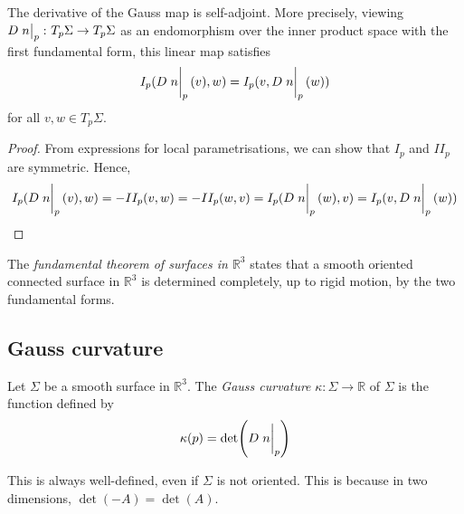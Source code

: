 \begin{lemma}
	The derivative of the Gauss map is self-adjoint.
	More precisely, viewing \( D \eval{n}_p \colon T_p \Sigma \to T_p \Sigma \) as an endomorphism over the inner product space with the first fundamental form, this linear map satisfies
	\[ I_p(D \eval{n}_p(v), w) = I_p(v, D \eval{n}_p(w)) \]
	for all \( v, w \in T_p \Sigma \).
\end{lemma}
\begin{proof}
	From expressions for local parametrisations, we can show that \( I_p \) and \( II_p \) are symmetric.
	Hence,
	\[ I_p(D\eval{n}_p(v),w) = -II_p(v,w) = -II_p(w,v) = I_p(D \eval{n}_p(w),v) = I_p(v,D\eval{n}_p(w)) \]
\end{proof}
\begin{remark}
	The \textit{fundamental theorem of surfaces in \( \mathbb R^3 \)} states that a smooth oriented connected surface in \( \mathbb R^3 \) is determined completely, up to rigid motion, by the two fundamental forms.
\end{remark}

\subsection{Gauss curvature}
\begin{definition}
	Let \( \Sigma \) be a smooth surface in \( \mathbb R^3 \).
	The \textit{Gauss curvature} \( \kappa \colon \Sigma \to \mathbb R \) of \( \Sigma \) is the function defined by
	\[ \kappa(p) = \det(D \eval{n}_p) \]
\end{definition}
\begin{remark}
	This is always well-defined, even if \( \Sigma \) is not oriented.
	This is because in two dimensions, \( \det(-A) = \det(A) \).
\end{remark}
